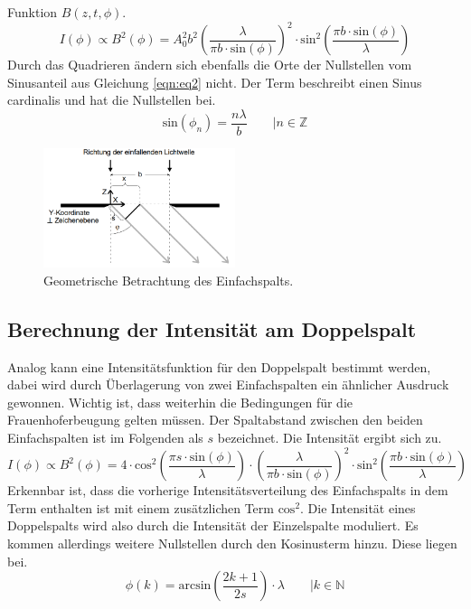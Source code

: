 Funktion $  B(z, t, \phi)$.
\begin{equation}
    \label{eqn:eq3}
I(\phi) \propto B^{2}(\phi) = A_{0}^{2} b^{2} \left( \frac{\lambda}{\pi b \cdot \text{sin}(\phi)}\right)^{2} \cdot \text{sin}^{2}\left(\frac{\pi b \cdot \text{sin}(\phi)}{\lambda}\right)
\end{equation}
Durch das Quadrieren ändern sich ebenfalls die Orte der Nullstellen vom Sinusanteil aus Gleichung \eqref{eqn:eq2} nicht. Der Term beschreibt einen Sinus cardinalis und hat die Nullstellen bei.
\begin{equation*}
\text{sin}(\phi_{n}) = \frac{n \lambda}{b} \quad \quad \bigl| n \in \mathbb{Z}
\end{equation*}
\begin{figure}
    \centering
    \includegraphics[width=0.5\textwidth]{bilder/2.png}
    \caption{Geometrische Betrachtung des Einfachspalts. \cite{skript}} 
    \label{fig:fig2}
\end{figure}
\subsection{Berechnung der Intensität am Doppelspalt}
Analog kann eine Intensitätsfunktion für den Doppelspalt bestimmt werden, dabei wird durch Überlagerung von zwei Einfachspalten ein ähnlicher Ausdruck gewonnen.
Wichtig ist, dass weiterhin die Bedingungen für die Frauenhoferbeugung gelten müssen. Der Spaltabstand zwischen den beiden Einfachspalten ist im Folgenden als $s$ bezeichnet.
Die Intensität ergibt sich zu.
\begin{equation}
    \label{eqn:eq4}
    I(\phi) \propto B^{2}(\phi) = 4 \cdot \text{cos}^{2}\left( \frac{\pi s \cdot \text{sin}(\phi)}{\lambda}\right) \cdot \left( \frac{\lambda}{\pi b \cdot \text{sin}(\phi)}\right)^{2} \cdot \text{sin}^{2}\left( \frac{\pi b \cdot \text{sin}(\phi)}{\lambda}\right)
\end{equation}
Erkennbar ist, dass die vorherige Intensitätsverteilung des Einfachspalts in dem Term enthalten ist mit einem zusätzlichen Term $\text{cos}^{2}$. Die Intensität eines Doppelspalts wird also durch die Intensität
der Einzelspalte moduliert.
Es kommen allerdings weitere Nullstellen durch den Kosinusterm hinzu. Diese liegen bei.
\begin{equation}
\phi(k)= \text{arcsin}\left(\frac{2k + 1}{2s}\right)\cdot \lambda \quad \quad \bigl| k \in \mathbb{N}
\end{equation}

